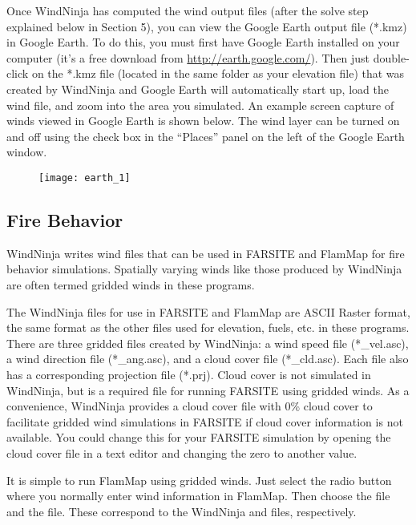 \documentclass[12pt]{article}
\begin{document}
Once WindNinja has computed the wind output files (after the solve step explained below in Section 5), you can view the Google Earth output file (*.kmz) in Google Earth.  To do this, you must first have Google Earth installed on your computer (it’s a free download from \url{http://earth.google.com/}).  Then just double-click on the *.kmz file (located in the same folder as your elevation file) that was created by WindNinja and Google Earth will automatically start up, load the wind file, and zoom into the area you simulated. An example screen capture of winds viewed in Google Earth is shown below.  The wind layer can be turned on and off using the check box in the “Places” panel on the left of the Google Earth window.

\begin{figure}[H]
	\label{}
	\texttt{[image: earth\_1]}
\end{figure}

\subsection{Fire Behavior}
WindNinja writes wind files that can be used in FARSITE and FlamMap for fire behavior simulations.  Spatially varying winds like those produced by WindNinja are often termed gridded winds in these programs.

The WindNinja files for use in FARSITE and FlamMap are ASCII Raster format, the same format as the other files used for elevation, fuels, etc. in these programs.  There are three gridded files created by WindNinja:  a wind speed file (*\_vel.asc), a wind direction file (*\_ang.asc), and a cloud cover file (*\_cld.asc).  Each file also has a corresponding projection file (*.prj).  Cloud cover is not simulated in WindNinja, but is a required file for running FARSITE using gridded winds.  As a convenience, WindNinja provides a cloud cover file with 0\% cloud cover to facilitate gridded wind simulations in FARSITE if cloud cover information is not available.  You could change this for your FARSITE simulation by opening the cloud cover file in a text editor and changing the zero to another value.

It is simple to run FlamMap using gridded winds.  Just select the  radio button where you normally enter wind information in FlamMap.  Then choose the  file and the  file.  These correspond to the WindNinja  and  files, respectively.
\end{document}

